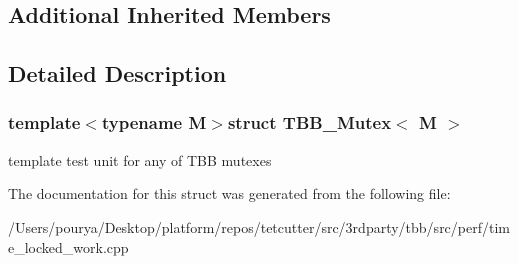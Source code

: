 \subsection*{Additional Inherited Members}


\subsection{Detailed Description}
\subsubsection*{template$<$typename M$>$struct T\+B\+B\+\_\+\+Mutex$<$ M $>$}

template test unit for any of T\+B\+B mutexes 

The documentation for this struct was generated from the following file\+:\begin{DoxyCompactItemize}
\item 
/\+Users/pourya/\+Desktop/platform/repos/tetcutter/src/3rdparty/tbb/src/perf/time\+\_\+locked\+\_\+work.\+cpp\end{DoxyCompactItemize}

